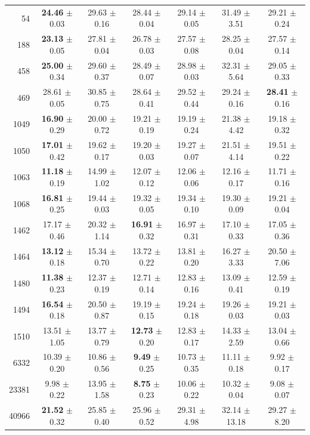 \begin{table}[t]
\begin{tabular*}{\textwidth}{@{\extracolsep{\fill}}rcccccc@{}}
54 & \textbf{24.46} $\pm$ 0.03 & 29.63 $\pm$ 0.16 & 28.44 $\pm$ 0.04 & 29.14 $\pm$ 0.05 & 31.49 $\pm$ 3.51 & 29.21 $\pm$ 0.24 \\
188 & \textbf{23.13} $\pm$ 0.05 & 27.81 $\pm$ 0.04 & 26.78 $\pm$ 0.03 & 27.57 $\pm$ 0.08 & 28.25 $\pm$ 0.04 & 27.57 $\pm$ 0.14 \\
458 & \textbf{25.00} $\pm$ 0.34 & 29.60 $\pm$ 0.37 & 28.49 $\pm$ 0.07 & 28.98 $\pm$ 0.03 & 32.31 $\pm$ 5.64 & 29.05 $\pm$ 0.33 \\
469 & 28.61 $\pm$ 0.05 & 30.85 $\pm$ 0.75 & 28.64 $\pm$ 0.41 & 29.52 $\pm$ 0.44 & 29.24 $\pm$ 0.16 & \textbf{28.41} $\pm$ 0.16 \\
1049 & \textbf{16.90} $\pm$ 0.29 & 20.00 $\pm$ 0.72 & 19.21 $\pm$ 0.19 & 19.19 $\pm$ 0.24 & 21.38 $\pm$ 4.42 & 19.18 $\pm$ 0.32 \\
1050 & \textbf{17.01} $\pm$ 0.42 & 19.62 $\pm$ 0.17 & 19.20 $\pm$ 0.03 & 19.27 $\pm$ 0.07 & 21.51 $\pm$ 4.14 & 19.51 $\pm$ 0.22 \\
1063 & \textbf{11.18} $\pm$ 0.19 & 14.99 $\pm$ 1.02 & 12.07 $\pm$ 0.12 & 12.06 $\pm$ 0.06 & 12.16 $\pm$ 0.17 & 11.71 $\pm$ 0.16 \\
1068 & \textbf{16.81} $\pm$ 0.25 & 19.44 $\pm$ 0.03 & 19.32 $\pm$ 0.05 & 19.34 $\pm$ 0.10 & 19.30 $\pm$ 0.09 & 19.21 $\pm$ 0.04 \\
1462 & 17.17 $\pm$ 0.46 & 20.32 $\pm$ 1.14 & \textbf{16.91} $\pm$ 0.32 & 16.97 $\pm$ 0.31 & 17.10 $\pm$ 0.33 & 17.05 $\pm$ 0.36 \\
1464 & \textbf{13.12} $\pm$ 0.18 & 15.34 $\pm$ 0.70 & 13.72 $\pm$ 0.22 & 13.81 $\pm$ 0.20 & 16.27 $\pm$ 3.33 & 20.50 $\pm$ 7.06 \\
1480 & \textbf{11.38} $\pm$ 0.23 & 12.37 $\pm$ 0.19 & 12.71 $\pm$ 0.14 & 12.83 $\pm$ 0.16 & 13.09 $\pm$ 0.41 & 12.59 $\pm$ 0.19 \\
1494 & \textbf{16.54} $\pm$ 0.18 & 20.50 $\pm$ 0.87 & 19.19 $\pm$ 0.15 & 19.24 $\pm$ 0.18 & 19.26 $\pm$ 0.03 & 19.21 $\pm$ 0.03 \\
1510 & 13.51 $\pm$ 1.05 & 13.77 $\pm$ 0.79 & \textbf{12.73} $\pm$ 0.20 & 12.83 $\pm$ 0.17 & 14.33 $\pm$ 2.59 & 13.04 $\pm$ 0.66 \\
6332 & 10.39 $\pm$ 0.20 & 10.86 $\pm$ 0.56 & \textbf{9.49} $\pm$ 0.25 & 10.73 $\pm$ 0.35 & 11.11 $\pm$ 0.18 & 9.92 $\pm$ 0.17 \\
23381 & 9.98 $\pm$ 0.22 & 13.95 $\pm$ 1.58 & \textbf{8.75} $\pm$ 0.23 & 10.06 $\pm$ 0.22 & 10.32 $\pm$ 0.04 & 9.08 $\pm$ 0.07 \\
40966 & \textbf{21.52} $\pm$ 0.32 & 25.85 $\pm$ 0.40 & 25.96 $\pm$ 0.52 & 29.31 $\pm$ 4.98 & 32.14 $\pm$ 13.18 & 29.27 $\pm$ 8.20 \\

\end{tabular*}
\end{table}

